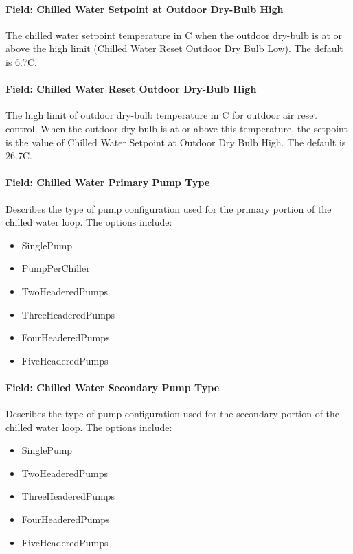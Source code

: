 \paragraph{Field: Chilled Water Setpoint at Outdoor Dry-Bulb High}\label{field-chilled-water-setpoint-at-outdoor-dry-bulb-high}

The chilled water setpoint temperature in C when the outdoor dry-bulb is at or above the high limit (Chilled Water Reset Outdoor Dry Bulb Low). The default is 6.7C.

\paragraph{Field: Chilled Water Reset Outdoor Dry-Bulb High}\label{field-chilled-water-reset-outdoor-dry-bulb-high}

The high limit of outdoor dry-bulb temperature in C for outdoor air reset control. When the outdoor dry-bulb is at or above this temperature, the setpoint is the value of Chilled Water Setpoint at Outdoor Dry Bulb High. The default is 26.7C.

\paragraph{Field: Chilled Water Primary Pump Type}\label{field-chilled-water-primary-pump-type}

Describes the type of pump configuration used for the primary portion of the chilled water loop. The options include:

\begin{itemize}
\item
  SinglePump
\item
  PumpPerChiller
\item
  TwoHeaderedPumps
\item
  ThreeHeaderedPumps
\item
  FourHeaderedPumps
\item
  FiveHeaderedPumps
\end{itemize}

\paragraph{Field: Chilled Water Secondary Pump Type}\label{field-chilled-water-secondary-pump-type}

Describes the type of pump configuration used for the secondary portion of the chilled water loop. The options include:

\begin{itemize}
\item
  SinglePump
\item
  TwoHeaderedPumps
\item
  ThreeHeaderedPumps
\item
  FourHeaderedPumps
\item
  FiveHeaderedPumps
\end{itemize}

